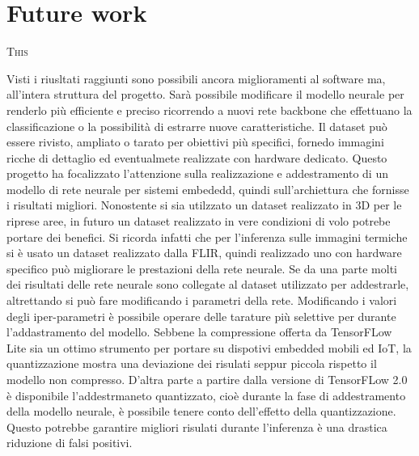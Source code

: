 \chapter{Future work}
\label{chap:future-work}
%
\lettrine[lines=3]{T}{his}

Visti i riusltati raggiunti sono possibili ancora miglioramenti al software ma,
all'intera struttura del progetto. Sarà possibile modificare il modello neurale
per renderlo più efficiente e preciso ricorrendo a nuovi rete backbone che
effettuano la classificazione o la possibilità di estrarre nuove
caratteristiche.
Il dataset può essere rivisto, ampliato o tarato per obiettivi più specifici,
fornedo immagini ricche di dettaglio ed eventualmete realizzate con hardware
dedicato. 
Questo progetto ha focalizzato l'attenzione sulla realizzazione e addestramento
di un modello di rete neurale per sistemi embededd, quindi sull'archiettura che
fornisse i risultati migliori. Nonostente si sia utilzzato un dataset realizzato
in 3D per le riprese aree, in futuro un dataset realizzato in vere condizioni di
volo potrebe portare dei benefici.
Si ricorda infatti che per l'inferenza sulle immagini termiche si è usato un
dataset realizzato dalla FLIR, quindi realizzado uno con hardware specifico può
migliorare le prestazioni della rete neurale. Se da una parte molti dei
risultati delle rete neurale sono collegate al dataset utilizzato per
addestrarle, altrettando si può fare modificando i parametri della rete.
Modificando i valori degli iper-parametri è possibile operare delle tarature più
selettive per durante l'addastramento del modello. Sebbene la compressione
offerta da TensorFLow Lite sia un ottimo strumento per portare su dispotivi
embedded mobili ed IoT, la quantizzazione mostra una deviazione dei risulati
seppur piccola rispetto il modello non compresso.
D'altra parte a partire dalla versione di TensorFLow 2.0 è disponibile
l'addestrmaneto quantizzato, cioè durante la fase di addestramento della modello
neurale, è possibile tenere conto dell'effetto della quantizzazione. Questo
potrebbe garantire migliori risulati durante l'inferenza è una drastica
riduzione di falsi positivi.
